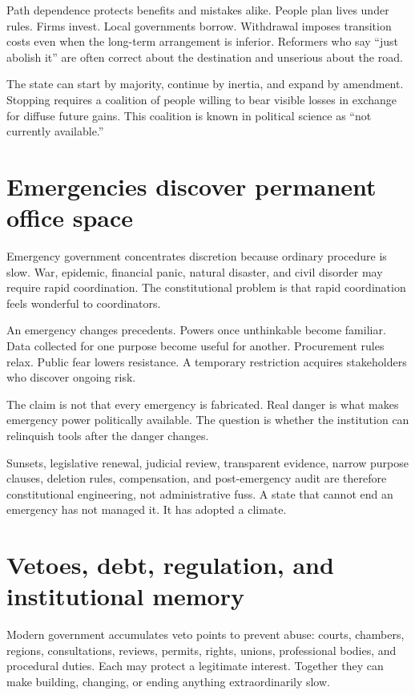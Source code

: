 \documentclass[12pt,a4paper]{book}
\begin{document}
Path dependence protects benefits and mistakes alike.  People plan lives under
rules.  Firms invest.  Local governments borrow.  Withdrawal imposes transition
costs even when the long-term arrangement is inferior.  Reformers who say
``just abolish it'' are often correct about the destination and unserious about
the road.

The state can start by majority, continue by inertia, and expand by amendment.
Stopping requires a coalition of people willing to bear visible losses in
exchange for diffuse future gains.  This coalition is known in political
science as ``not currently available.''

\section{Emergencies discover permanent office space}

Emergency government concentrates discretion because ordinary procedure is
slow.  War, epidemic, financial panic, natural disaster, and civil disorder
may require rapid coordination.  The constitutional problem is that rapid
coordination feels wonderful to coordinators.

An emergency changes precedents.  Powers once unthinkable become familiar.
Data collected for one purpose become useful for another.  Procurement rules
relax.  Public fear lowers resistance.  A temporary restriction acquires
stakeholders who discover ongoing risk.

The claim is not that every emergency is fabricated.  Real danger is what
makes emergency power politically available.  The question is whether the
institution can relinquish tools after the danger changes.

Sunsets, legislative renewal, judicial review, transparent evidence, narrow
purpose clauses, deletion rules, compensation, and post-emergency audit are
therefore constitutional engineering, not administrative fuss.  A state that
cannot end an emergency has not managed it.  It has adopted a climate.

\section{Vetoes, debt, regulation, and institutional memory}

Modern government accumulates veto points to prevent abuse: courts, chambers,
regions, consultations, reviews, permits, rights, unions, professional bodies,
and procedural duties.  Each may protect a legitimate interest.  Together
they can make building, changing, or ending anything extraordinarily slow.
\end{document}
